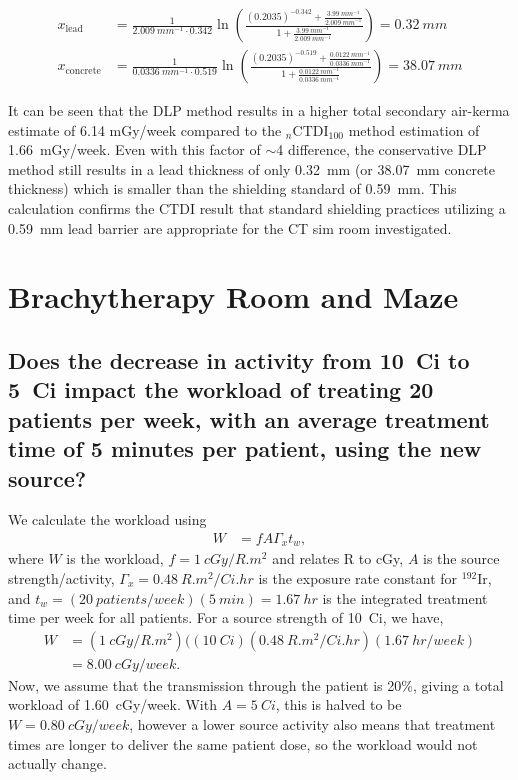 \documentclass[%
aps,
mph,%
amsmath,amssymb,
preprint,%
tightenlines,
longbibliography,
superscriptaddress,
floatfix,
nofootinbib,
]{revtex4-2}
\begin{document}
        
        \begin{align*}
            x\mathrm{_{lead}} &= \frac{1}{\qty{2.009}{mm^{-1}}\cdot0.342}\ln\left(\frac{( 0.2035)^{-0.342}+\frac{\qty{3.99}{mm^{-1}}}{\qty{2.009}{mm^{-1}}}}{1+ \frac{\qty{3.99}{mm^{-1}}}{\qty{2.009}{mm^{-1}}}} \right) = \qty{0.32}{mm}\\
            x\mathrm{_{concrete}} &= \frac{1}{\qty{0.0336}{mm^{-1}}\cdot0.519}\ln\left(\frac{( 0.2035)^{-0.519}+\frac{\qty{0.0122}{mm^{-1}}}{\qty{0.0336}{mm^{-1}}}}{1+ \frac{\qty{0.0122}{mm^{-1}}}{\qty{0.0336}{mm^{-1}}}} \right) = \qty{38.07}{mm}
        \end{align*}
        
        It can be seen that the DLP method results in a higher total secondary air-kerma estimate of 6.14 mGy/week compared to the $_n\mathrm{CTDI}_{100}$ method estimation of \qty{1.66}{mGy/week}. Even with this factor of $\sim$4 difference, the conservative DLP method still results in a lead thickness of only \qty{0.32}{mm} (or \qty{38.07}{mm} concrete thickness) which is smaller than the shielding standard of \qty{0.59}{mm}. This calculation confirms the CTDI result that standard shielding practices utilizing a \qty{0.59}{mm} lead barrier are appropriate for the CT sim room investigated. 

\section{Brachytherapy Room and Maze}
    \subsection{Does the decrease in activity from \SI{10}{Ci} to \SI{5}{Ci} impact the workload of treating 20 patients per week, with an average treatment time of 5 minutes per patient, using the new source?}
    We calculate the workload using
    \begin{align}
        W &= f A \Gamma_x t_w,
    \end{align}
    where $W$ is the workload, $f = \qty{1}{cGy/R.m^2}$ and relates R to cGy, $A$ is the source strength/activity, $\Gamma_x = \SI{0.48}{R.m^2/Ci.hr}$ is the exposure rate constant for $^{192}\mathrm{Ir}$, and $t_w = \left( \qty{20}{patients/week} \right)\left(\qty{5}{min}\right) = \qty{1.67}{hr}$ is the integrated treatment time per week for all patients. For a source strength of \SI{10}{Ci}, we have,
    \begin{align*}
        W &= \left(\qty{1}{cGy/R.m^2}\right)(\left( \SI{10}{Ci} \right) \left( \SI{0.48}{R.m^2/Ci.hr} \right) \left( \qty{1.67}{hr/week} \right) \\
        &= \qty{8.00}{cGy/week}.
    \end{align*}
    Now, we assume that the transmission through the patient is 20\%, giving a total workload of \qty{1.60}{cGy/week}. With $A = \SI{5}{Ci}$, this is halved to be $W = \qty{0.80}{cGy/week}$, however a lower source activity also means that treatment times are longer to deliver the same patient dose, so the workload would not actually change.
\end{document}
